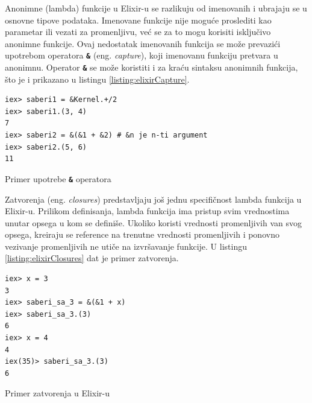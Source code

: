 \documentclass[12pt,oneside]{memoir}
\begin{document}
Anonimne (lambda) funkcije u Elixir-u se razlikuju od imenovanih i ubrajaju se u osnovne tipove
podataka. Imenovane funkcije nije moguće proslediti kao parametar ili vezati za promenljivu,
već se za to mogu korisiti isključivo anonimne funkcije. Ovaj nedostatak imenovanih funkcija se može prevazići upotrebom
operatora \texttt{\textbf{\&}} (eng. \emph{capture}), koji imenovanu funkciju pretvara u
anonimnu. Operator \texttt{\textbf{\&}} se može koristiti i za kraću sintaksu anonimnih funkcija,
što je i prikazano u listingu \ref{listing:elixirCapture}.
\begin{listing}[!h]
\begin{verbatim}
iex> saberi1 = &Kernel.+/2
iex> saberi1.(3, 4)
7
iex> saberi2 = &(&1 + &2) # &n je n-ti argument
iex> saberi2.(5, 6)
11
\end{verbatim}
\caption{Primer upotrebe \texttt{\textbf{\&}} operatora}
\label{listing:elixirCapture}
\end{listing}

Zatvorenja (eng. \emph{closures}) predstavljaju još jednu specifičnost lambda funkcija u
Elixir-u. Prilikom definisanja, lambda funkcija ima pristup svim vrednostima unutar opsega u
kom se definiše. Ukoliko koristi vrednosti promenljivih van svog opsega, kreiraju se reference na trenutne
vrednosti promenljivih i ponovno vezivanje promenljivih ne utiče na izvršavanje funkcije. U
listingu \ref{listing:elixirClosures} dat je primer zatvorenja.
\begin{listing}[!h]
\begin{verbatim}
iex> x = 3
3
iex> saberi_sa_3 = &(&1 + x)
iex> saberi_sa_3.(3)
6
iex> x = 4
4
iex(35)> saberi_sa_3.(3)
6
\end{verbatim}
\caption{Primer zatvorenja u Elixir-u}
\label{listing:elixirClosures}
\end{listing}
 
\end{document}
